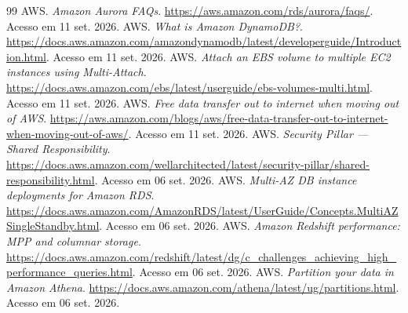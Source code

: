 \documentclass[11pt,a4paper]{article}
\begin{document}
\begin{thebibliography}{99}
 AWS. \textit{Amazon Aurora FAQs}. \url{https://aws.amazon.com/rds/aurora/faqs/}. Acesso em 11 set. 2026.
 AWS. \textit{What is Amazon DynamoDB?}. \url{https://docs.aws.amazon.com/amazondynamodb/latest/developerguide/Introduction.html}. Acesso em 11 set. 2026.
 AWS. \textit{Attach an EBS volume to multiple EC2 instances using Multi-Attach}. \url{https://docs.aws.amazon.com/ebs/latest/userguide/ebs-volumes-multi.html}. Acesso em 11 set. 2026.
 AWS. \textit{Free data transfer out to internet when moving out of AWS}. \url{https://aws.amazon.com/blogs/aws/free-data-transfer-out-to-internet-when-moving-out-of-aws/}. Acesso em 11 set. 2026.
 AWS. \textit{Security Pillar --- Shared Responsibility}. \url{https://docs.aws.amazon.com/wellarchitected/latest/security-pillar/shared-responsibility.html}. Acesso em 06 set. 2026.
 AWS. \textit{Multi-AZ DB instance deployments for Amazon RDS}. \url{https://docs.aws.amazon.com/AmazonRDS/latest/UserGuide/Concepts.MultiAZSingleStandby.html}. Acesso em 06 set. 2026.
 AWS. \textit{Amazon Redshift performance: MPP and columnar storage}. \url{https://docs.aws.amazon.com/redshift/latest/dg/c_challenges_achieving_high_performance_queries.html}. Acesso em 06 set. 2026.
 AWS. \textit{Partition your data in Amazon Athena}. \url{https://docs.aws.amazon.com/athena/latest/ug/partitions.html}. Acesso em 06 set. 2026.
\end{thebibliography}
\end{document}
